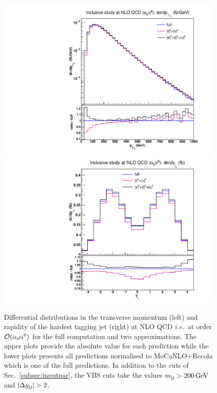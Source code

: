 \begin{figure}[hbt]
\centering
{\includegraphics[scale=0.35]{figures/scanfigures/ptj1_nlo.pdf}}
{\includegraphics[scale=0.35]{figures/scanfigures/yj1_nlo.pdf}}
\caption{Differential distributions in the transverse momentum (left) and rapidity of the hardest tagging jet (right) at NLO QCD \emph{i.e.}\ at order $\mathcal{O}(\alpha_\text{s}\alpha^6)$ for the full computation and two approximations.
The upper plots provide the absolute value for each prediction while the lower plots presents all predictions normalised to {\sc MoCaNLO}+{\sc Recola} which is one of the full predictions.
In addition to the cuts of Sec.~\ref{subsec:inputpar}, the VBS cuts take the values $m_{\text{j}\text{j}}>200 \,\text{GeV}$ and $|\Delta y_{\Pj\Pj}|>2$.} 
\label{fig:mjjdyjj_1d_2}
\end{figure}

